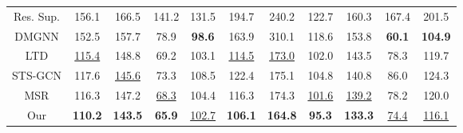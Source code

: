 \begin{table}[ht]
{\begin{tabular}{c|cc|cc|cc|cc|cc}
        Res. Sup.   & 156.1          & 166.5          & 141.2         & 131.5         & 194.7          & 240.2          & 122.7         & 160.3          & 167.4         & 201.5          \\
        DMGNN       & 152.5          & 157.7          & 78.9          & \textbf{98.6} & 163.9          & 310.1          & 118.6         & 153.8          & \textbf{60.1} & \textbf{104.9} \\
        LTD         & \underline{115.4}    & 148.8          & 69.2          & 103.1         & \underline{114.5}    & \underline{173.0}    & 102.0         & 143.5          & 78.3          & 119.7          \\
        STS-GCN      & 117.6          & \underline{145.6}    & 73.3          & 108.5         & 122.4          & 175.1          & 104.8         & 140.8          & 86.0          & 124.3          \\
        MSR         & 116.3          & 147.2          & \underline{68.3}    & 104.4         & 116.3          & 174.3          & \underline{101.6}   & \underline{139.2}    & 78.2          & 120.0          \\
        Our         & \textbf{110.2} & \textbf{143.5} & \textbf{65.9} & \underline{102.7}   & \textbf{106.1} & \textbf{164.8} & \textbf{95.3} & \textbf{133.3} & \underline{74.4}    & \underline{116.1}   \\ \hline
        \end{tabular}
        }
        

\end{table}
